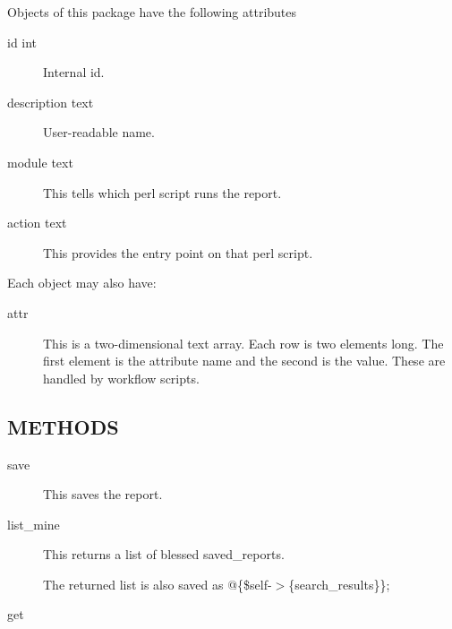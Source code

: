 \begin{description}
\begin{description}
\begin{description}
\begin{description}
\begin{description}
Objects of this package have the following attributes

\begin{description}

\item[{id int}] \mbox{}

Internal id.


\item[{description text}] \mbox{}

User-readable name.


\item[{module text}] \mbox{}

This tells which perl script runs the report.


\item[{action text}] \mbox{}

This provides the entry point on that perl script.

\end{description}


Each object may also have:

\begin{description}

\item[{attr}] \mbox{}

This is a two-dimensional text array.  Each row is two elements long.  The first
element is the attribute name and the second is the value.  These are handled
by workflow scripts.

\end{description}
\subsection*{METHODS\label{LedgerSMB::DBObject::Saved_Report:_Saved_Report_Handling_for_LSMB_METHODS}}
\begin{description}

\item[{save}] \mbox{}

This saves the report.


\item[{list\_mine}] \mbox{}

This returns a list of blessed saved\_reports.



The returned list is also saved as @\{\$self-$>$\{search\_results\}\};


\item[{get}] \mbox{}


\end{description}
\end{description}
\end{description}
\end{description}
\end{description}
\end{description}
